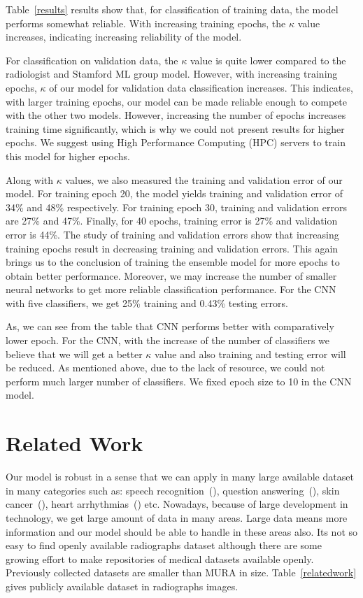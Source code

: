\documentclass{article}
\begin{document}
Table~\ref{results} results show that, for classification of training data, the model performs somewhat reliable. With increasing training epochs, the $\kappa$ value increases, indicating increasing reliability of the model.

For classification on validation data, the $\kappa$ value is quite lower compared to the radiologist and Stamford ML group model. However, with increasing training epochs, $\kappa$ of our model for validation data classification increases. This indicates, with larger training epochs, our model can be made reliable enough to compete with the other two models. However, increasing the number of epochs increases training time significantly, which is why we could not present results for higher epochs. We suggest using High Performance Computing (HPC) servers to train this model for higher epochs.

Along with $\kappa$ values, we also measured the training and validation error of our model. For training epoch 20, the model yields training and validation error of 34\% and 48\% respectively. For training epoch 30, training and validation errors are 27\% and 47\%. Finally, for 40 epochs, training error is 27\% and validation error is 44\%. The study of training and validation errors show that increasing training epochs result in decreasing training and validation errors. This again brings us to the conclusion of training the ensemble model for more epochs to obtain better performance. Moreover, we may increase the number of smaller neural networks to get more reliable classification performance. For the CNN with five classifiers, we get 25\% training and 0.43\% testing errors.

As, we can see from the table that CNN performs better with comparatively lower epoch. For the CNN, with the increase of the number of classifiers we believe that we will get a better $\kappa$ value and also training and testing error will be reduced. As mentioned above, due to the lack of resource, we could not perform much larger number of classifiers. We fixed epoch size to 10 in the CNN model. 

\section{Related Work}
Our model is robust in a sense that we can apply in many large available dataset in many categories such as: speech recognition~(\cite{hannun}), question answering~(\cite{pranav_16}), skin cancer~(\cite{esteva}), heart arrhythmias~(\cite{pranav_17}) etc. Nowadays, because of large development in technology, we get large amount of data in many areas. Large data means more information and our model should be able to handle in these areas also. Its not so easy to find openly available radiographs dataset although there are some growing effort to make repositories of medical datasets available openly. Previously collected datasets are smaller than MURA in size. Table~\ref{relatedwork} gives publicly available dataset in radiographs images.
\end{document}

